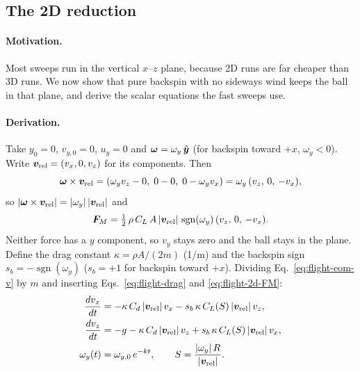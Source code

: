 \subsection{The 2D reduction}
\label{sec:flight-2d}

\paragraph{Motivation.}
Most sweeps run in the vertical $x$--$z$ plane, because 2D runs are far cheaper than 3D runs.
We now show that pure backspin with no sideways wind keeps the ball in that plane, and derive the
scalar equations the fast sweeps use.

\paragraph{Derivation.}
Take $y_0 = 0$, $v_{y,0} = 0$, $u_y = 0$ and $\bm{\omega} = \omega_y\,\hat{\bm{y}}$
(for backspin toward $+x$, $\omega_y < 0$).
Write $\bm{v}_{\mathrm{rel}} = (v_x, 0, v_z)$ for its components.
Then
\begin{equation}
  \bm{\omega}\times\bm{v}_{\mathrm{rel}}
  = (\omega_y v_z - 0,\; 0 - 0,\; 0 - \omega_y v_x)
  = \omega_y\,(v_z,\,0,\,-v_x),
  \label{eq:flight-2d-cross}
\end{equation}
so $|\bm{\omega}\times\bm{v}_{\mathrm{rel}}| = |\omega_y|\,|\bm{v}_{\mathrm{rel}}|$ and
\begin{equation}
  \bm{F}_M = \tfrac12\,\rho\,C_L\,A\,|\bm{v}_{\mathrm{rel}}|\,\operatorname{sgn}(\omega_y)\,(v_z,\,0,\,-v_x).
  \label{eq:flight-2d-FM}
\end{equation}
Neither force has a $y$ component, so $v_y$ stays zero and the ball stays in the plane.
Define the drag constant $\kappa = \rho A/(2m)$ (\unit{1/m}) and the backspin sign
$s_b = -\operatorname{sgn}(\omega_y)$ ($s_b = +1$ for backspin toward $+x$).
Dividing Eq.~\eqref{eq:flight-eom-v} by $m$ and inserting Eqs.~\eqref{eq:flight-drag} and \eqref{eq:flight-2d-FM}:
\begin{align}
  \frac{dv_x}{dt} &= -\kappa\,C_d\,|\bm{v}_{\mathrm{rel}}|\,v_x - s_b\,\kappa\,C_L(S)\,|\bm{v}_{\mathrm{rel}}|\,v_z, \label{eq:flight-2d-ax}\\
  \frac{dv_z}{dt} &= -g - \kappa\,C_d\,|\bm{v}_{\mathrm{rel}}|\,v_z + s_b\,\kappa\,C_L(S)\,|\bm{v}_{\mathrm{rel}}|\,v_x, \label{eq:flight-2d-az}\\
  \omega_y(t) &= \omega_{y,0}\,e^{-kt}, \qquad S = \frac{|\omega_y|\,R}{|\bm{v}_{\mathrm{rel}}|}. \label{eq:flight-2d-w}
\end{align}
